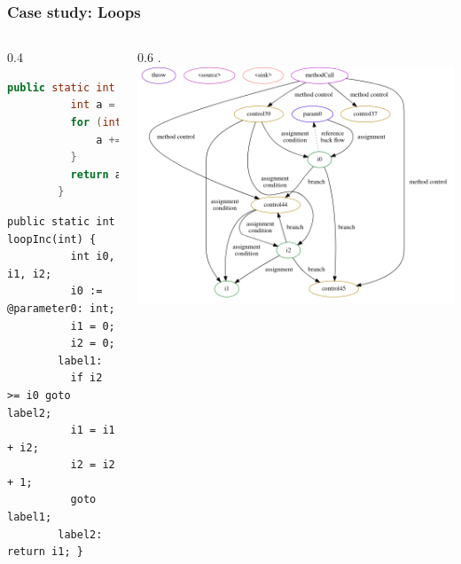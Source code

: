 \documentclass{beamer}
\begin{document}
\begin{frame}[fragile, t]
  \frametitle{Case study: Loops}
  \begin{columns}[t]
    \begin{column}{0.4\textwidth}
      \begin{lstlisting}[style=j, language=java, gobble=6, tabsize=2, basicstyle=\ttfamily\tiny]
        public static int loopInc(int i) {
          int a = 0;
          for (int j = 0; j < i; j++) {
              a += j;
          }
          return a;
        }

      \end{lstlisting}
      \begin{lstlisting}[style=j, gobble=6, tabsize=2, basicstyle=\ttfamily\tiny]
        public static int loopInc(int) {
          int i0, i1, i2;
          i0 := @parameter0: int;
          i1 = 0;
          i2 = 0;
        label1:
          if i2 >= i0 goto label2;
          i1 = i1 + i2;
          i2 = i2 + 1;
          goto label1;
        label2: return i1; }
      \end{lstlisting}
    \end{column}
    \begin{column}{0.6\textwidth}
      {\tiny.} %
      \includegraphics[scale=0.25]{screenshot20201217140733.png}
    \end{column}
  \end{columns}
\end{frame}
\end{document}
